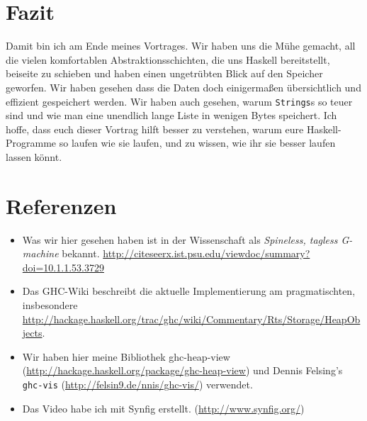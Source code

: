 \documentclass[11pt,DIV=12,parskip=half,headings=normal,abstract]{scrartcl}
\newcommand{\li}{\lstinline[style=haskell]}
\begin{document}
\section{Fazit}

Damit bin ich am Ende meines Vortrages. Wir haben uns die Mühe gemacht, all die vielen komfortablen Abstraktionsschichten, die uns Haskell bereitstellt, beiseite zu schieben und haben einen ungetrübten Blick auf den Speicher geworfen. Wir haben gesehen dass die Daten doch einigermaßen übersichtlich und effizient gespeichert werden. Wir haben auch gesehen, warum \li-Strings-s so teuer sind und wie man eine unendlich lange Liste in wenigen Bytes speichert. Ich hoffe, dass euch dieser Vortrag hilft besser zu verstehen, warum eure Haskell-Programme so laufen wie sie laufen, und zu wissen, wie ihr sie besser laufen lassen könnt.

\section{Referenzen}

\begin{itemize}
\item Was wir hier gesehen haben ist in der Wissenschaft als \emph{Spineless, tagless G-machine} bekannt. \url{http://citeseerx.ist.psu.edu/viewdoc/summary?doi=10.1.1.53.3729}
\item Das GHC-Wiki beschreibt die aktuelle Implementierung am pragmatischten, insbesondere \url{http://hackage.haskell.org/trac/ghc/wiki/Commentary/Rts/Storage/HeapObjects}.
\item Wir haben hier meine Bibliothek ghc-heap-view (\url{http://hackage.haskell.org/package/ghc-heap-view}) und Dennis Felsing’s \li!ghc-vis! (\url{http://felsin9.de/nnis/ghc-vis/}) verwendet.
\item Das Video habe ich mit Synfig erstellt. (\url{http://www.synfig.org/})
\end{itemize}
\end{document}

